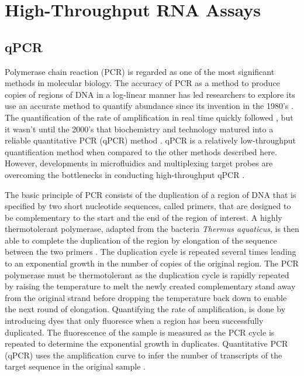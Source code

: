 \documentclass[../main.tex]{subfiles}
\begin{document}
\section{High-Throughput RNA Assays}

\subsection{qPCR}

Polymerase chain reaction (PCR) is regarded as one of the most significant methods in molecular biology.
The accuracy of PCR as a method to produce copies of regions of DNA in a log-linear manner has led researchers to explore its use an accurate method to quantify abundance since its invention in the 1980's \parencite{Saiki1988}.
The quantification of the rate of amplification in real time quickly followed \parencite{Holland1991}, but it wasn't until the 2000's that biochemistry and technology matured into a reliable quantitative PCR (qPCR) method \parencite{Walker2002}.
qPCR is a relatively low-throughput quantification method when compared to the other methods described here.
However, developments in microfluidics and multiplexing target probes are overcoming the bottlenecks in conducting high-throughput qPCR \parencite{Dreier2022}.

The basic principle of PCR consists of the duplication of a region of DNA that is specified by two short nucleotide sequences, called primers, that are designed to be complementary to the start and the end of the region of interest. 
A highly thermotolerant polymerase, adapted from the bacteria \textit{Thermus aquaticus}, is then able to complete the duplication of the region by elongation of the sequence between the two primers \parencite{Saiki1988}.
The duplication cycle is repeated several times leading to an exponential growth in the number of copies of the original region.
The PCR polymerase must be thermotolerant as the duplication cycle is rapidly repeated by raising the temperature to melt the newly created complementary stand away from the original strand before dropping the temperature back down to enable the next round of elongation. 
Quantifying the rate of amplification, is done by introducing dyes that only fluoresce when a region has been successfully duplicated. 
The fluorescence of the sample is measured as the PCR cycle is repeated to determine the exponential growth in duplicates.
Quantitative PCR (qPCR) uses the amplification curve to infer the number of transcripts of the target sequence in the original sample \parencite{Holland1991}.
\end{document}
